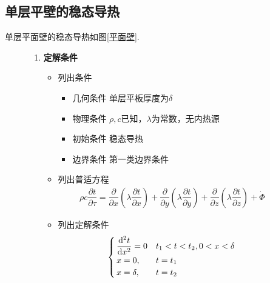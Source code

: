 \subsection{单层平壁的稳态导热}
单层平面壁的稳态导热如图\ref{平面壁}.
\begin{figure}[!htb]
\begin{minipage}{0.7\linewidth}
	\begin{enumerate}[\textbf{步骤} 1 ]
		\item \textbf{定解条件}
		\begin{itemize}
			\item 列出条件
			\begin{itemize}
				\item 几何条件
				\quad 单层平板厚度为$δ$
				\item 物理条件
				\quad $\rho ,c$已知，$λ$为常数，无内热源
				\item 初始条件
				\quad 稳态导热
				\item 边界条件
				\quad 第一类边界条件
			\end{itemize}
			\item 列出普适方程
			\begin{align*}
				\rho c \dfrac{\partial t}{\partial \tau} = \dfrac{\partial }{\partial x}\left(\lambda \dfrac{\partial t}{\partial x}\right) + \dfrac{\partial }{\partial y}\left(\lambda \dfrac{\partial t}{\partial y}\right) + \dfrac{\partial }{\partial z}\left(\lambda \dfrac{\partial t}{\partial z}\right) + \dot{\varPhi} 
			\end{align*}
			\item 列出定解条件
			\begin{align}
				\begin{cases}
					\, \dfrac{{\rm{d}}^2 t}{{\rm{d}} x^2} = 0 & t_1< t<t_2, 0< x< \delta\\
					\, x = 0, & t = t_1\\
					\, x = \delta, & t = t_2
				\end{cases}
			\end{align}
		\end{itemize}
	\end{enumerate}
\end{minipage}
\begin{minipage}{0.3\linewidth}
		\centering

\end{minipage}
\end{figure}

